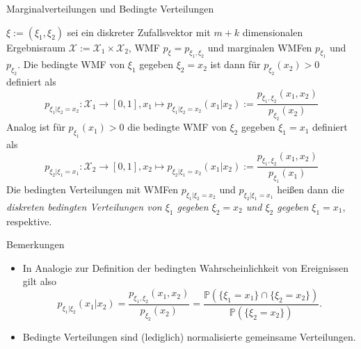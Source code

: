 \documentclass[
  8pt,
  ignorenonframetext,
]{beamer}
\providecommand{\tightlist}{%
  \setlength{\itemsep}{0pt}\setlength{\parskip}{0pt}}
\begin{document}
\begin{frame}{Marginalverteilungen und Bedingte Verteilungen}
\protect\hypertarget{marginalverteilungen-und-bedingte-verteilungen-4}{}
\footnotesize
\begin{definition}
\justifying
$\xi:= (\xi_1,\xi_2)$ sei ein diskreter Zufallsvektor mit $m + k$ dimensionalen Ergebnisraum
$\mathcal{X} := \mathcal{X}_1 \times \mathcal{X}_2$, WMF $p_\xi = p_{\xi_1,\xi_2}$
und marginalen WMFen $p_{\xi_1}$ und $p_{\xi_2}$. Die bedingte WMF von $\xi_1$ gegeben
$\xi_2 = x_2$ ist dann für $p_{\xi_2}(x_2) > 0$ definiert als
\begin{equation}
p_{\xi_1|\xi_2 = x_2} : \mathcal{X}_1 \to [0,1],
x_1 \mapsto p_{\xi_1|\xi_2 = x_2}(x_1|x_2) := \frac{p_{\xi_1,\xi_2}(x_1,x_2)}{p_{\xi_2}(x_2)}
\end{equation}
Analog ist für $p_{\xi_1}(x_1) > 0$ die bedingte WMF von $\xi_2$ gegeben $\xi_1 = x_1$
definiert als
\begin{equation}
p_{\xi_2|\xi_1 = x_1} : \mathcal{X}_2 \to [0,1],
x_2 \mapsto p_{\xi_2|\xi_1 = x_2}(x_1|x_2) := \frac{p_{\xi_1,\xi_2}(x_1,x_2)}{p_{\xi_1}(x_1)}
\end{equation}
Die bedingten Verteilungen mit WMFen $p_{\xi_1|\xi_2 = x_2}$ und $p_{\xi_2|\xi_1 = x_1}$
heißen dann die \textit{diskreten bedingten Verteilungen von $\xi_1$ gegeben $\xi_2 = x_2$
und $\xi_2$ gegeben $\xi_1 = x_1$}, respektive.
\end{definition}

Bemerkungen

\begin{itemize}
\tightlist
\item
  In Analogie zur Definition der bedingten Wahrscheinlichkeit von
  Ereignissen gilt also \begin{equation}
  p_{\xi_1|\xi_2}(x_1|x_2)
  = \frac{p_{\xi_1,\xi_2}(x_1,x_2)}{p_{\xi_2}(x_2)}
  = \frac{\mathbb{P}(\{\xi_1 = x_1\} \cap \{\xi_2 = x_2\})}{\mathbb{P}(\{\xi_2 = x_2\})}.
  \end{equation}
\item
  Bedingte Verteilungen sind (lediglich) normalisierte gemeinsame
  Verteilungen.
\end{itemize}
\end{frame}
\end{document}
